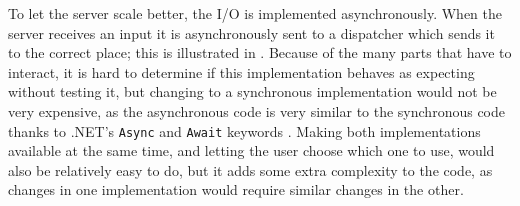 To let the server scale better, the I/O is implemented asynchronously. When the server receives an input it is asynchronously sent to a dispatcher which sends it to the correct place; this is illustrated in . Because of the many parts that have to interact, it is hard to determine if this implementation behaves as expecting without testing it, but changing to a synchronous implementation would not be very expensive, as the asynchronous code is very similar to the synchronous code thanks to .NET's \texttt{Async} and \texttt{Await} keywords \cite{ms-asyn}. Making both implementations available at the same time, and letting the user choose which one to use, would also be relatively easy to do, but it adds some extra complexity to the code, as changes in one implementation would require similar changes in the other.



%
%

